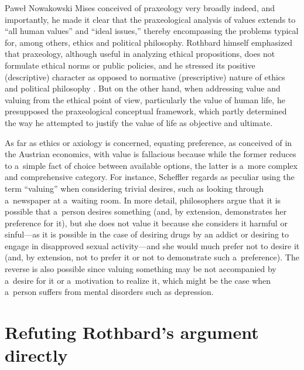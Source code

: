 \begin{artengenv}{Paweł Nowakowski}
Mises conceived of praxeology very broadly indeed, and importantly, he made it clear that the praxeological analysis of values extends to ``all human values'' and ``ideal issues,'' thereby encompassing the problems typical for, among others, ethics and political philosophy. Rothbard himself emphasized that praxeology, although useful in analyzing ethical propositions, does not formulate ethical norms or public policies, and he stressed its positive (descriptive) character as opposed to normative (prescriptive) nature of ethics and political philosophy 
\parencite[see, e.g.,][p.1297ff]{Rothbard2009Man}. %
 But on the other hand, when addressing value and valuing from the ethical point of view, particularly the value of human life, he presupposed the praxeological conceptual framework, which partly determined the way he attempted to justify the value of life as objective and ultimate.



As far as ethics or axiology is concerned, equating preference, as conceived of in the Austrian economics, with value is fallacious because while the former reduces to a~simple fact of choice between available options, the latter is a~more complex and comprehensive category. For instance, Scheffler 
\parencite*[][p.24]{Scheffler2011Valuing} %
 regards as peculiar using the term ``valuing'' when considering trivial desires, such as looking through a~newspaper at a~waiting room. In more detail, philosophers argue 
\parencite[see discussion in][]{Scheffler2011Valuing} %
 that it is possible that a~person desires something (and, by extension, demonstrates her preference for it), but she does not value it because she considers it harmful or sinful---as it is possible in the case of desiring drugs by an addict or desiring to engage in disapproved sexual activity---and she would much prefer not to desire it (and, by extension, not to prefer it or not to demonstrate such a~preference). The reverse is also possible since valuing something may be not accompanied by a~desire for it or a~motivation to realize it, which might be the case when a~person suffers from mental disorders such as depression.



\section{Refuting Rothbard's argument directly}


\end{artengenv}
